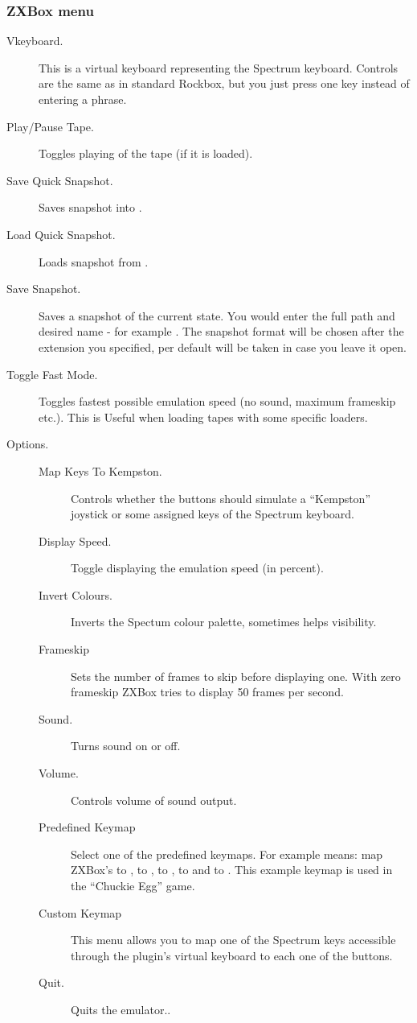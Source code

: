 \subsubsection{ZXBox menu}
\begin{description}
\item[ Vkeyboard.]
    This is a virtual keyboard representing the Spectrum keyboard. Controls are
    the same as in standard Rockbox, but you just press one key instead of
    entering a phrase.
\item[Play/Pause Tape.] Toggles playing of the tape (if it is loaded).
\item[Save Quick Snapshot.] Saves snapshot into .
\item[Load Quick Snapshot.] Loads snapshot from .
\item[Save Snapshot.]
    Saves a snapshot of the current state. You would enter the full path and
    desired name - for example . The
    snapshot format will be chosen after the extension you specified, per
    default  will be taken in case you leave it open.
\item[Toggle Fast Mode.]
    Toggles fastest possible emulation speed (no sound, maximum frameskip etc.).
    This is Useful when loading tapes with some specific loaders.
\item[Options.]
    \begin{description}
    \item[Map Keys To Kempston.]
        Controls whether the \daps{} buttons should simulate a ``Kempston''
        joystick or some assigned keys of the Spectrum keyboard.
    \item[Display Speed.]Toggle displaying the emulation speed (in percent).
    \item[Invert Colours.]
        Inverts the Spectum colour palette, sometimes helps visibility.
    \item[Frameskip]
        Sets the number of frames to skip before displaying one. With zero
        frameskip ZXBox tries to display 50 frames per second.
    \item[Sound.]Turns sound on or off.
    \item[Volume.]Controls volume of sound output.
    \item[Predefined Keymap]
        Select one of the predefined keymaps. For example  means:
        map ZXBox's  to ,  to ,
         to ,  to  and
         to . This example keymap is used in the
        ``Chuckie Egg'' game.
    \item[Custom Keymap]
        This menu allows you to map one of the Spectrum keys accessible through the 
        plugin's virtual keyboard to each one of the buttons.
    \item[Quit.] Quits the emulator..
    \end{description}
\end{description}

